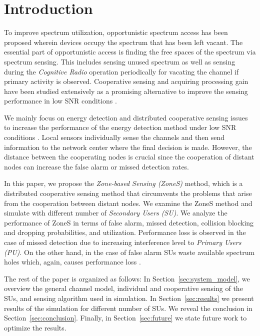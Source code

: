 \documentclass[conference,compsoc]{IEEEtran}
\begin{document}
\IEEEpeerreviewmaketitle



\section{Introduction}
To improve spectrum utilization, opportunistic spectrum access has been proposed wherein devices occupy the spectrum that has been left vacant. The essential part of opportunistic access is finding the free spaces of the spectrum via spectrum sensing. This includes sensing unused spectrum as well as sensing during the \emph{Cognitive Radio} operation periodically for vacating the channel if primary activity is observed. Cooperative sensing and acquiring processing gain have been studied extensively as a promising alternative to improve the sensing performance in low SNR conditions \cite{ganesan2005css, kattepur2007data, quan2008spatial, quan2009optimal, unnikrishnan2008csp, aysal2008cooperative}.

We mainly focus on energy detection and distributed cooperative sensing issues to increase the performance of the energy detection method under low SNR conditions \cite{sensingReview2011}. Local sensors individually sense the channels and then send information to the network center where the final decision is made\cite{crSensingCDMA2010}. However, the distance between the cooperating nodes is crucial since the cooperation of distant nodes can increase the false alarm or missed detection rates.

In this paper, we propose the \textit{Zone-based Sensing (ZoneS)} method, which is a distributed cooperative sensing method that circumvents the problems that arise from the cooperation between distant nodes. We examine the ZoneS method and simulate with different number of \textit{Secondary Users (SU)}. We analyze the performance of ZoneS in terms of false alarm, missed detection, collision blocking and dropping probabilities, and utilization. Performance loss is observed in the case of missed detection due to increasing interference level to \textit{Primary Users (PU)}. On the other hand, in the case of false alarm SUs waste available spectrum holes which, again, causes performance loss \cite{parameterOptimization}.

The rest of the paper is organized as follows: In Section~\ref{sec:system_model}, we overview the general channel model, individual and cooperative sensing of the SUs, and sensing algorithm used in simulation. In Section~\ref{sec:results} we present results of the simulation for different number of SUs. We reveal the conclusion in Section~\ref{sec:conclusion}. Finally, in Section~\ref{sec:future} we state future work to optimize the results.
\end{document}
